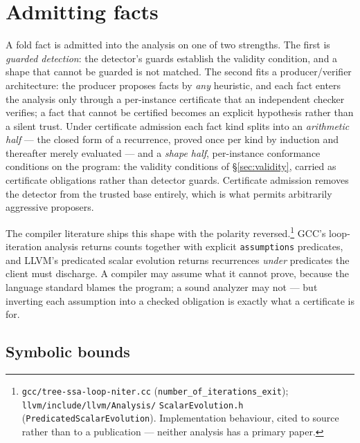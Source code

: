 \documentclass[11pt,a4paper]{article}
\begin{document}
\section{Admitting facts}
\label{sec:certs}

A fold fact is admitted into the analysis on one of two strengths. The first is
\emph{guarded detection}: the detector's guards establish the validity condition, and a
shape that cannot be guarded is not matched. The second fits a producer/verifier
architecture: the producer proposes facts by \emph{any} heuristic, and each fact enters
the analysis only through a per-instance certificate that an independent checker
verifies; a fact that cannot be certified becomes an explicit hypothesis rather than a
silent trust. Under certificate admission each fact kind splits into an \emph{arithmetic
half} --- the closed form of a recurrence, proved once per kind by induction and
thereafter merely evaluated --- and a \emph{shape half}, per-instance conformance
conditions on the program: the validity conditions of \S\ref{sec:validity}, carried as
certificate obligations rather than detector guards. Certificate admission removes the
detector from the trusted base entirely, which is what permits arbitrarily aggressive
proposers.

The compiler literature ships this shape with the polarity
reversed.\footnote{\texttt{gcc/tree-ssa-loop-niter.cc}
(\texttt{number\_of\_iterations\_exit}); \texttt{llvm/include/llvm/Analysis/}
\texttt{ScalarEvolution.h} (\texttt{PredicatedScalarEvolution}). Implementation
behaviour, cited to source rather than to a publication --- neither analysis has a
primary paper.} GCC's loop-iteration analysis returns counts together with explicit
\texttt{assumptions} predicates, and LLVM's predicated scalar evolution returns
recurrences \emph{under} predicates the client must discharge. A compiler may assume what it cannot prove, because the language standard
blames the program; a sound analyzer may not --- but inverting each assumption into a
checked obligation is exactly what a certificate is for.

\subsection{Symbolic bounds}
\label{sec:symbolic}
\end{document}
